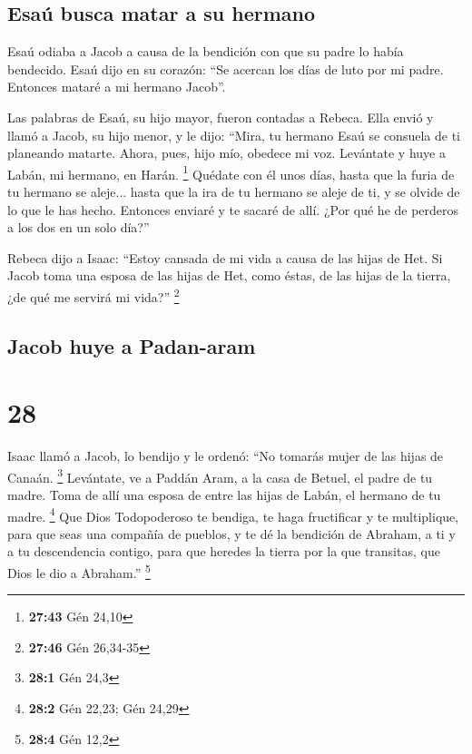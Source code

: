 \hypertarget{esauxfa-busca-matar-a-su-hermano}{%
\subsection{Esaú busca matar a su
hermano}\label{esauxfa-busca-matar-a-su-hermano}}

 Esaú odiaba a Jacob a causa de la bendición con que su
padre lo había bendecido. Esaú dijo en su corazón: ``Se acercan los días
de luto por mi padre. Entonces mataré a mi hermano Jacob''.

 Las palabras de Esaú, su hijo mayor, fueron contadas a
Rebeca. Ella envió y llamó a Jacob, su hijo menor, y le dijo: ``Mira, tu
hermano Esaú se consuela de ti planeando matarte.  Ahora,
pues, hijo mío, obedece mi voz. Levántate y huye a Labán, mi hermano, en
Harán. \footnote{\textbf{27:43} Gén 24,10}  Quédate con
él unos días, hasta que la furia de tu hermano se aleje...
 hasta que la ira de tu hermano se aleje de ti, y se
olvide de lo que le has hecho. Entonces enviaré y te sacaré de allí.
¿Por qué he de perderos a los dos en un solo día?''

 Rebeca dijo a Isaac: ``Estoy cansada de mi vida a causa
de las hijas de Het. Si Jacob toma una esposa de las hijas de Het, como
éstas, de las hijas de la tierra, ¿de qué me servirá mi vida?''
\footnote{\textbf{27:46} Gén 26,34-35}

\hypertarget{jacob-huye-a-padan-aram}{%
\subsection{Jacob huye a Padan-aram}\label{jacob-huye-a-padan-aram}}

\hypertarget{section-27}{%
\section{28}\label{section-27}}

 Isaac llamó a Jacob, lo bendijo y le ordenó: ``No tomarás
mujer de las hijas de Canaán. \footnote{\textbf{28:1} Gén 24,3}
 Levántate, ve a Paddán Aram, a la casa de Betuel, el
padre de tu madre. Toma de allí una esposa de entre las hijas de Labán,
el hermano de tu madre. \footnote{\textbf{28:2} Gén 22,23; Gén 24,29}
 Que Dios Todopoderoso te bendiga, te haga fructificar y
te multiplique, para que seas una compañía de pueblos,  y
te dé la bendición de Abraham, a ti y a tu descendencia contigo, para
que heredes la tierra por la que transitas, que Dios le dio a Abraham.''
\footnote{\textbf{28:4} Gén 12,2}


